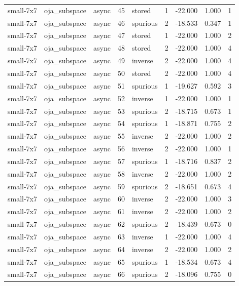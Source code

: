 \begin{tabular}{lllrlrrrr}
small-7x7 & oja\_subspace & async & 45 & stored & 1 & -22.000 & 1.000 & 1 \\
small-7x7 & oja\_subspace & async & 46 & spurious & 2 & -18.533 & 0.347 & 1 \\
small-7x7 & oja\_subspace & async & 47 & stored & 1 & -22.000 & 1.000 & 2 \\
small-7x7 & oja\_subspace & async & 48 & stored & 2 & -22.000 & 1.000 & 4 \\
small-7x7 & oja\_subspace & async & 49 & inverse & 2 & -22.000 & 1.000 & 4 \\
small-7x7 & oja\_subspace & async & 50 & stored & 2 & -22.000 & 1.000 & 4 \\
small-7x7 & oja\_subspace & async & 51 & spurious & 1 & -19.627 & 0.592 & 3 \\
small-7x7 & oja\_subspace & async & 52 & inverse & 1 & -22.000 & 1.000 & 1 \\
small-7x7 & oja\_subspace & async & 53 & spurious & 2 & -18.715 & 0.673 & 1 \\
small-7x7 & oja\_subspace & async & 54 & spurious & 1 & -18.871 & 0.755 & 2 \\
small-7x7 & oja\_subspace & async & 55 & inverse & 2 & -22.000 & 1.000 & 2 \\
small-7x7 & oja\_subspace & async & 56 & inverse & 2 & -22.000 & 1.000 & 1 \\
small-7x7 & oja\_subspace & async & 57 & spurious & 1 & -18.716 & 0.837 & 2 \\
small-7x7 & oja\_subspace & async & 58 & inverse & 2 & -22.000 & 1.000 & 2 \\
small-7x7 & oja\_subspace & async & 59 & spurious & 2 & -18.651 & 0.673 & 4 \\
small-7x7 & oja\_subspace & async & 60 & inverse & 2 & -22.000 & 1.000 & 3 \\
small-7x7 & oja\_subspace & async & 61 & inverse & 2 & -22.000 & 1.000 & 2 \\
small-7x7 & oja\_subspace & async & 62 & spurious & 2 & -18.439 & 0.673 & 0 \\
small-7x7 & oja\_subspace & async & 63 & inverse & 1 & -22.000 & 1.000 & 4 \\
small-7x7 & oja\_subspace & async & 64 & inverse & 2 & -22.000 & 1.000 & 2 \\
small-7x7 & oja\_subspace & async & 65 & spurious & 1 & -18.534 & 0.673 & 4 \\
small-7x7 & oja\_subspace & async & 66 & spurious & 2 & -18.096 & 0.755 & 0 \\

\end{tabular}
